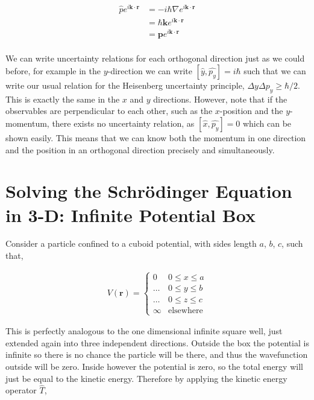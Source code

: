 \documentclass[11pt]{amsart}
\begin{document}
\begin{align*}
  \hat{p}e^{i\mathbf{k}\cdot\mathbf{r}}&=-i\hbar\nabla e^{i\mathbf{k}\cdot\mathbf{r}}\\
                                       &=\hbar\mathbf{k} e^{i\mathbf{k}\cdot\mathbf{r}}\\
                                       &=\mathbf{p}e^{i\mathbf{k}\cdot\mathbf{r}}\\
\end{align*}


We can write uncertainty relations for each orthogonal direction just as we could before, for example in the $y$-direction we can write $[\hat{y},\hat{p_y}]=i\hbar$ such that we can write our usual relation for the Heisenberg uncertainty principle, $\Delta y\Delta p_y \geq \hbar/2$. This is exactly the same in the $x$ and $y$ directions. However, note that if the observables are perpendicular to each other, such as the $x$-position and the $y$-momentum, there exists no uncertainty relation, as $[\hat{x},\hat{p_y}]=0$ which can be shown easily. This means that we can know both the momentum in one direction and the position in an orthogonal direction precisely and simultaneously.

\section{Solving the Schr\"{o}dinger Equation in 3-D: Infinite Potential Box}

Consider a particle confined to a cuboid potential, with sides length $a$, $b$, $c$, such that,

\begin{align*}
  V(\mathbf{r})=
  \begin{cases}
    0 & 0\leq x\leq a \\
    \dots & 0\leq y\leq b \\
    \dots & 0\leq z\leq c \\
    \infty & \text{elsewhere}
  \end{cases}
\end{align*}

This is perfectly analogous to the one dimensional infinite square well, just extended again into three independent directions. Outside the box the potential is infinite so there is no chance the particle will be there, and thus the wavefunction outside will be zero. Inside however the potential is zero, so the total energy will just be equal to the kinetic energy. Therefore by applying the kinetic energy operator $\hat{T}$,
\end{document}
